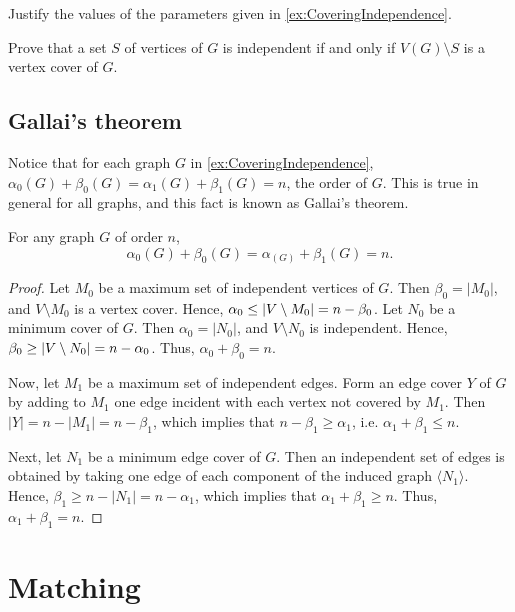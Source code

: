 \begin{Exercise}
Justify the values of the parameters given in \cref{ex:CoveringIndependence}.
\end{Exercise}

\begin{Exercise}
Prove that a set $S$ of vertices of $G$ is independent if and only if $V(G) \setminus S$ is a vertex cover of $G$.
\end{Exercise}

\subsection*{Gallai's theorem}
Notice that for each graph $G$ in \cref{ex:CoveringIndependence}, $\alpha_0(G) + \beta_0(G) = \alpha_1(G) + \beta_1(G) = n$, the order of $G$. This is true in general for all graphs, and this fact is known as Gallai's theorem.

\begin{Theorem}[Gallai]
For any graph $G$ of order $n$,
\begin{equation*}
\alpha_0(G) + \beta_0(G) = \alpha_(G) + \beta_1(G) = n.
\end{equation*}
\end{Theorem}

\begin{proof}
Let $M_0$ be a maximum set of independent vertices of $G$. Then $\beta_0 = |M_0|$, and $V \setminus M_0$ is a vertex cover. Hence, $\alpha_0 \le \vqty{V \setminus M_0} = n - \beta_0$. Let $N_0$ be a minimum cover of $G$. Then $\alpha_0 = |N_0|$, and $V \setminus N_0$ is independent. Hence, $\beta_0 \ge \vqty{V \setminus N_0} = n - \alpha_0$. Thus, $\alpha_0 + \beta_0 = n$.

Now, let $M_1$ be a maximum set of independent edges. Form an edge cover $Y$ of $G$ by adding to $M_1$ one edge incident with each vertex not covered by $M_1$. Then $|Y| = n - |M_1| = n - \beta_1$, which implies that $n - \beta_1 \ge \alpha_1$, i.e. $\alpha_1 + \beta_1 \le n$.

Next, let $N_1$ be a minimum edge cover of $G$. Then an independent set of edges is obtained by taking one edge of each component of the induced graph $\langle N_1 \rangle$. Hence, $\beta_1 \ge n - |N_1| = n - \alpha_1$, which implies that $\alpha_1 + \beta_1 \ge n$. Thus, $\alpha_1 + \beta_1 = n$.
\end{proof}


\section{Matching}\label{sec:Matching}

